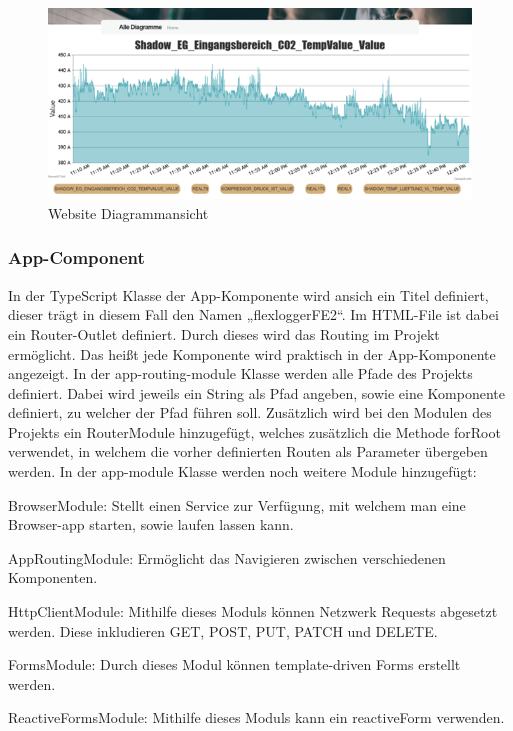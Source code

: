 \begin{figure}
    \centering
    \includegraphics[scale=0.5]{pics/FlexLoggerWebsiteDiagramm.png}
    \caption{Website Diagrammansicht}
    \label{fig:impl:FlexLoggerDiagrammAnsicht}
\end{figure}

\subsubsection{App-Component}
In der TypeScript Klasse der App-Komponente wird ansich ein Titel definiert, dieser trägt in diesem Fall den Namen „flexloggerFE2“. Im HTML-File ist dabei ein Router-Outlet definiert. Durch dieses wird das Routing im Projekt ermöglicht. Das heißt jede Komponente wird praktisch in der App-Komponente angezeigt. In der app-routing-module Klasse werden alle Pfade des Projekts definiert. Dabei wird jeweils ein String als Pfad angeben, sowie eine Komponente definiert, zu welcher der Pfad führen soll. Zusätzlich wird bei den Modulen des Projekts ein RouterModule hinzugefügt, welches zusätzlich die Methode forRoot verwendet, in welchem die vorher definierten Routen als Parameter übergeben werden. In der app-module Klasse werden noch weitere Module hinzugefügt: 

\begin{compactitem}
    \item BrowserModule: Stellt einen Service zur Verfügung, mit welchem man eine Browser-app starten, sowie laufen lassen kann.    
    \item AppRoutingModule: Ermöglicht das Navigieren zwischen verschiedenen Komponenten.     
    \item HttpClientModule: Mithilfe dieses Moduls können Netzwerk Requests abgesetzt werden. Diese inkludieren GET, POST, PUT, PATCH und DELETE.    
    \item FormsModule: Durch dieses Modul können template-driven Forms erstellt werden.    
    \item ReactiveFormsModule: Mithilfe dieses Moduls kann ein reactiveForm verwenden. 
\end{compactitem}

